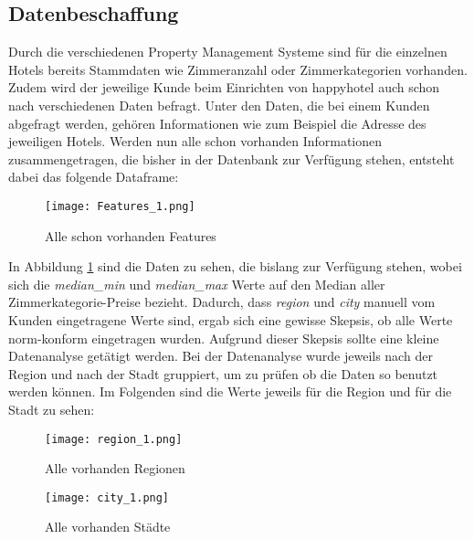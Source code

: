 \subsection{Datenbeschaffung}
\label{subsec:Datenbeschaffung}
Durch die verschiedenen Property Management Systeme sind für die einzelnen Hotels bereits Stammdaten wie Zimmeranzahl oder Zimmerkategorien vorhanden. Zudem wird der jeweilige Kunde beim Einrichten von happyhotel auch schon nach verschiedenen Daten befragt. Unter den Daten, die bei einem Kunden abgefragt werden, gehören Informationen wie zum Beispiel die Adresse des jeweiligen Hotels. 
\newline
\newline
Werden nun alle schon vorhanden Informationen zusammengetragen, die bisher in der Datenbank zur Verfügung stehen, entsteht dabei das folgende Dataframe:
\begin{figure}[h]
    \centering
    \texttt{[image: Features\_1.png]}
    \caption[Alle schon vorhanden Features]{Alle schon vorhanden Features}
    \label{img:all_Features}
\end{figure}

In Abbildung \ref{img:all_Features} sind die Daten zu sehen, die bislang zur Verfügung stehen, wobei sich die \emph{median\_min} und \emph{median\_max} Werte auf den Median aller Zimmerkategorie-Preise bezieht.
\newline
\newline
Dadurch, dass \emph{region} und \emph{city} manuell vom Kunden eingetragene Werte sind, ergab sich eine gewisse Skepsis, ob alle Werte norm-konform eingetragen wurden. Aufgrund dieser Skepsis sollte eine kleine Datenanalyse getätigt werden. 
\newline
\newline
Bei der Datenanalyse wurde jeweils nach der Region und nach der Stadt gruppiert, um zu prüfen ob die Daten so benutzt werden können. Im Folgenden sind die Werte jeweils für die Region und für die Stadt zu sehen:

\begin{figure}[h]
    \centering
    \texttt{[image: region\_1.png]}
    \caption[Alle vorhanden Regionen]{Alle vorhanden Regionen}
    \label{img:region_1}
\end{figure}

\begin{figure}[h]
    \centering
    \texttt{[image: city\_1.png]}
    \caption[Alle vorhanden Städte]{Alle vorhanden Städte}
    \label{img:city_1}
\end{figure}

